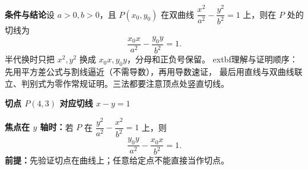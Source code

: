 \begin{statementbox}
\textbf{条件与结论}\quad 设 $a>0,b>0$，且 $P(x_0,y_0)$ 在双曲线
$\dfrac{x^2}{a^2}-\dfrac{y^2}{b^2}=1$ 上，则在 $P$ 处的切线为
\[
\boxed{\frac{x_0x}{a^2}-\frac{y_0y}{b^2}=1}.
\]
半代换时只把 $x^2,y^2$ 换成 $x_0x,y_0y$，分母和正负号保留。
	extbf{理解与证明顺序：}先用平方差公式与割线逼近（不需导数），再用导数速证，
最后用直线与双曲线联立、判别式为零作常规证明。三法都要注意顶点处竖直切线。
\begin{center}
\textbf{切点 $P(4,3)$ 对应切线 $x-y=1$}\par\medskip

\end{center}
\textbf{焦点在 $y$ 轴时：}若 $P$ 在 $\dfrac{y^2}{a^2}-\dfrac{x^2}{b^2}=1$ 上，则
\[
\boxed{\frac{y_0y}{a^2}-\frac{x_0x}{b^2}=1}.
\]
\textbf{前提：}先验证切点在曲线上；任意给定点不能直接当作切点。
\end{statementbox}
